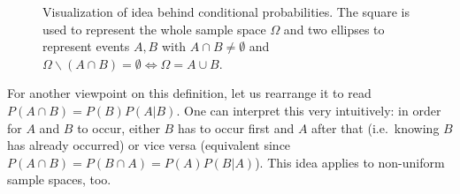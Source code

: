 \begin{figure}[t]
\centering



\def\A{(-1,0) ellipse [rotate=30, x radius=1, y radius=2]}
\def\B{(1,0) ellipse [rotate=-30, x radius=1, y radius=2]}
\def\O{(-3,-3) rectangle (3,3)}






\caption{Visualization of idea behind conditional probabilities. The square is used to represent the whole sample space $\Omega$ and two ellipses to represent events $A, B$ with $A \cap B \neq \emptyset$ and $\Omega\backslash (A \cap B) = \emptyset \Leftrightarrow \Omega = A \cup B$.}%
\label{fig:cond_prob}
\end{figure}



For another viewpoint on this definition, let us rearrange it to read $P(A \cap B) = P(B) P(A | B)$. One can interpret this very intuitively: in order for $A$ and $B$ to occur, either $B$ has to occur first and $A$ after that (i.e.~knowing $B$ has already occurred) or vice versa (equivalent since $P(A \cap B) = P(B \cap A) = P(A) P(B | A)$). This idea applies to non-uniform sample spaces, too.



